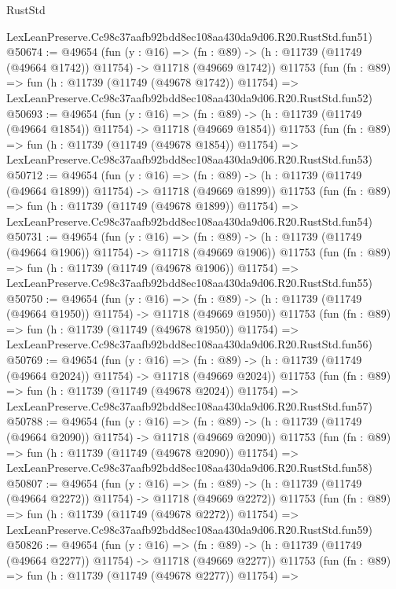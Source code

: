 \begin{lexlean}{RustStd}
\begin{coremodule}
    LexLeanPreserve.Cc98c37aafb92bdd8ec108aa430da9d06.R20.RustStd.fun51)
@50674 := @49654
    (fun (y : @16) =>
    (fn : @89) -> (h : @11739 (@11749 (@49664 @1742)) @11754) -> @11718 (@49669 @1742))
    @11753
    (fun (fn : @89) =>
    fun (h : @11739 (@11749 (@49678 @1742)) @11754) =>
    LexLeanPreserve.Cc98c37aafb92bdd8ec108aa430da9d06.R20.RustStd.fun52)
@50693 := @49654
    (fun (y : @16) =>
    (fn : @89) -> (h : @11739 (@11749 (@49664 @1854)) @11754) -> @11718 (@49669 @1854))
    @11753
    (fun (fn : @89) =>
    fun (h : @11739 (@11749 (@49678 @1854)) @11754) =>
    LexLeanPreserve.Cc98c37aafb92bdd8ec108aa430da9d06.R20.RustStd.fun53)
@50712 := @49654
    (fun (y : @16) =>
    (fn : @89) -> (h : @11739 (@11749 (@49664 @1899)) @11754) -> @11718 (@49669 @1899))
    @11753
    (fun (fn : @89) =>
    fun (h : @11739 (@11749 (@49678 @1899)) @11754) =>
    LexLeanPreserve.Cc98c37aafb92bdd8ec108aa430da9d06.R20.RustStd.fun54)
@50731 := @49654
    (fun (y : @16) =>
    (fn : @89) -> (h : @11739 (@11749 (@49664 @1906)) @11754) -> @11718 (@49669 @1906))
    @11753
    (fun (fn : @89) =>
    fun (h : @11739 (@11749 (@49678 @1906)) @11754) =>
    LexLeanPreserve.Cc98c37aafb92bdd8ec108aa430da9d06.R20.RustStd.fun55)
@50750 := @49654
    (fun (y : @16) =>
    (fn : @89) -> (h : @11739 (@11749 (@49664 @1950)) @11754) -> @11718 (@49669 @1950))
    @11753
    (fun (fn : @89) =>
    fun (h : @11739 (@11749 (@49678 @1950)) @11754) =>
    LexLeanPreserve.Cc98c37aafb92bdd8ec108aa430da9d06.R20.RustStd.fun56)
@50769 := @49654
    (fun (y : @16) =>
    (fn : @89) -> (h : @11739 (@11749 (@49664 @2024)) @11754) -> @11718 (@49669 @2024))
    @11753
    (fun (fn : @89) =>
    fun (h : @11739 (@11749 (@49678 @2024)) @11754) =>
    LexLeanPreserve.Cc98c37aafb92bdd8ec108aa430da9d06.R20.RustStd.fun57)
@50788 := @49654
    (fun (y : @16) =>
    (fn : @89) -> (h : @11739 (@11749 (@49664 @2090)) @11754) -> @11718 (@49669 @2090))
    @11753
    (fun (fn : @89) =>
    fun (h : @11739 (@11749 (@49678 @2090)) @11754) =>
    LexLeanPreserve.Cc98c37aafb92bdd8ec108aa430da9d06.R20.RustStd.fun58)
@50807 := @49654
    (fun (y : @16) =>
    (fn : @89) -> (h : @11739 (@11749 (@49664 @2272)) @11754) -> @11718 (@49669 @2272))
    @11753
    (fun (fn : @89) =>
    fun (h : @11739 (@11749 (@49678 @2272)) @11754) =>
    LexLeanPreserve.Cc98c37aafb92bdd8ec108aa430da9d06.R20.RustStd.fun59)
@50826 := @49654
    (fun (y : @16) =>
    (fn : @89) -> (h : @11739 (@11749 (@49664 @2277)) @11754) -> @11718 (@49669 @2277))
    @11753
    (fun (fn : @89) =>
    fun (h : @11739 (@11749 (@49678 @2277)) @11754) =>

\end{coremodule}
\end{lexlean}

